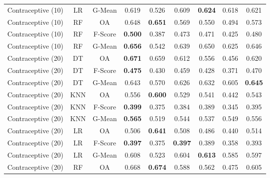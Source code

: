 \begin{longtable}{ccccccccc}
Contraceptive (10) &         LR &  G-Mean &          0.619 &          0.526 &          0.609 & \textbf{0.624} &          0.618 &          0.621 \\
Contraceptive (10) &         RF &      OA &          0.648 & \textbf{0.651} &          0.569 &          0.550 &          0.494 &          0.573 \\
Contraceptive (10) &         RF & F-Score & \textbf{0.500} &          0.387 &          0.473 &          0.471 &          0.425 &          0.480 \\
Contraceptive (10) &         RF &  G-Mean & \textbf{0.656} &          0.542 &          0.639 &          0.650 &          0.625 &          0.646 \\
Contraceptive (20) &         DT &      OA & \textbf{0.671} &          0.659 &          0.612 &          0.556 &          0.456 &          0.620 \\
Contraceptive (20) &         DT & F-Score & \textbf{0.475} &          0.430 &          0.459 &          0.428 &          0.371 &          0.470 \\
Contraceptive (20) &         DT &  G-Mean &          0.643 &          0.570 &          0.626 &          0.632 &          0.605 & \textbf{0.645} \\
Contraceptive (20) &        KNN &      OA &          0.556 & \textbf{0.600} &          0.529 &          0.541 &          0.442 &          0.543 \\
Contraceptive (20) &        KNN & F-Score & \textbf{0.399} &          0.375 &          0.384 &          0.389 &          0.345 &          0.395 \\
Contraceptive (20) &        KNN &  G-Mean & \textbf{0.565} &          0.519 &          0.544 &          0.537 &          0.549 &          0.556 \\
Contraceptive (20) &         LR &      OA &          0.506 & \textbf{0.641} &          0.508 &          0.486 &          0.440 &          0.514 \\
Contraceptive (20) &         LR & F-Score & \textbf{0.397} &          0.375 & \textbf{0.397} &          0.389 &          0.358 &          0.393 \\
Contraceptive (20) &         LR &  G-Mean &          0.608 &          0.523 &          0.604 & \textbf{0.613} &          0.585 &          0.597 \\
Contraceptive (20) &         RF &      OA &          0.668 & \textbf{0.674} &          0.588 &          0.562 &          0.475 &          0.605 \\

\end{longtable}
